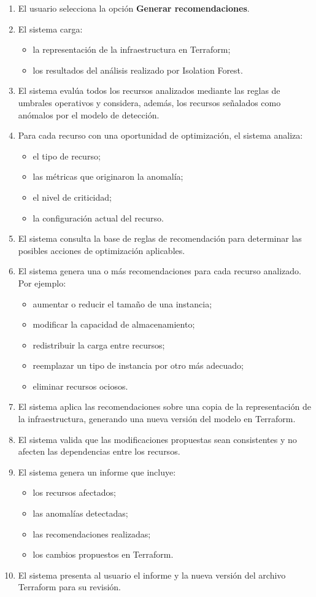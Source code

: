 \begin{enumerate}
\item El usuario selecciona la opción \textbf{Generar recomendaciones}.
\item El sistema carga:
  \begin{itemize}
  \item la representación de la infraestructura en Terraform;
  \item los resultados del análisis realizado por Isolation Forest.
  \end{itemize}
\item El sistema evalúa todos los recursos analizados mediante las reglas de umbrales operativos y considera, además, los recursos señalados como anómalos por el modelo de detección.
\item Para cada recurso con una oportunidad de optimización, el sistema analiza:
  \begin{itemize}
  \item el tipo de recurso;
  \item las métricas que originaron la anomalía;
  \item el nivel de criticidad;
  \item la configuración actual del recurso.
  \end{itemize}
\item El sistema consulta la base de reglas de recomendación para determinar las posibles acciones de optimización aplicables.
\item El sistema genera una o más recomendaciones para cada recurso analizado. Por ejemplo:
  \begin{itemize}
  \item aumentar o reducir el tamaño de una instancia;
  \item modificar la capacidad de almacenamiento;
  \item redistribuir la carga entre recursos;
  \item reemplazar un tipo de instancia por otro más adecuado;
  \item eliminar recursos ociosos.
  \end{itemize}
\item El sistema aplica las recomendaciones sobre una copia de la representación de la infraestructura, generando una nueva versión del modelo en Terraform.
\item El sistema valida que las modificaciones propuestas sean consistentes y no afecten las dependencias entre los recursos.
\item El sistema genera un informe que incluye:
  \begin{itemize}
  \item los recursos afectados;
  \item las anomalías detectadas;
  \item las recomendaciones realizadas;
  \item los cambios propuestos en Terraform.
  \end{itemize}
\item El sistema presenta al usuario el informe y la nueva versión del archivo Terraform para su revisión.
\end{enumerate}

